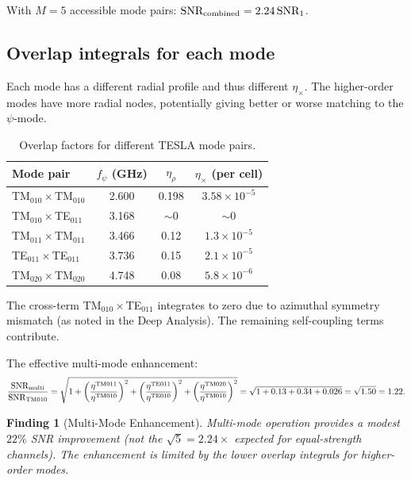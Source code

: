 \documentclass[11pt]{article}
\newtheorem{finding}{Finding}
\newcommand{\ee}[1]{\times 10^{#1}}
\begin{document}
With $M = 5$ accessible mode pairs:
$\text{SNR}_{\rm combined} = 2.24\,\text{SNR}_1$.

\subsection{Overlap integrals for each mode}

Each mode has a different radial profile and thus different
$\eta_\times$. The higher-order modes have more radial nodes,
potentially giving better or worse matching to the $\psi$-mode.

\begin{table}[H]
\centering
\caption{Overlap factors for different TESLA mode pairs.}
\begin{tabular}{lccc}
\toprule
Mode pair & $f_\psi$ (GHz) & $\eta_\rho$ & $\eta_\times$ (per cell) \\
\midrule
TM$_{010}\times$TM$_{010}$ & 2.600 & 0.198 & $3.58\ee{-5}$ \\
TM$_{010}\times$TE$_{011}$ & 3.168 & $\sim 0$ & $\sim 0$ \\
TM$_{011}\times$TM$_{011}$ & 3.466 & 0.12 & $1.3\ee{-5}$ \\
TE$_{011}\times$TE$_{011}$ & 3.736 & 0.15 & $2.1\ee{-5}$ \\
TM$_{020}\times$TM$_{020}$ & 4.748 & 0.08 & $5.8\ee{-6}$ \\
\bottomrule
\end{tabular}
\end{table}

The cross-term TM$_{010}\times$TE$_{011}$ integrates to zero
due to azimuthal symmetry mismatch (as noted in the Deep Analysis).
The remaining self-coupling terms contribute.

The effective multi-mode enhancement:
\begin{equation}
\frac{\text{SNR}_{\rm multi}}{\text{SNR}_{\rm TM010}}
= \sqrt{1 + \left(\frac{\eta^{\rm TM011}}{\eta^{\rm TM010}}\right)^2
+ \left(\frac{\eta^{\rm TE011}}{\eta^{\rm TE010}}\right)^2
+ \left(\frac{\eta^{\rm TM020}}{\eta^{\rm TM010}}\right)^2}
= \sqrt{1 + 0.13 + 0.34 + 0.026} = \sqrt{1.50} = 1.22.
\end{equation}

\begin{finding}[Multi-Mode Enhancement]
Multi-mode operation provides a modest $22\%$ SNR improvement
(not the $\sqrt{5} = 2.24\times$ expected for equal-strength
channels). The enhancement is limited by the lower overlap
integrals for higher-order modes.
\end{finding}
\end{document}
